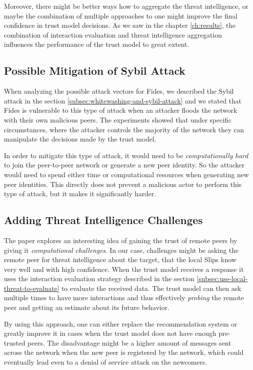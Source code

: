 Moreover, there might be better ways how to aggregate the threat intelligence, or maybe the combination of multiple approaches to one might improve the final confidence in trust model decisions.
As we saw in the chapter \ref{ch:results}, the combination of interaction evaluation and threat intelligence aggregation influences the performance of the trust model to great extent.

\subsection{Possible Mitigation of Sybil Attack}
\label{subsec:possible-mittigation-of-sybil-attack}
When analyzing the possible attack vectors for Fides, we described the Sybil attack in the section \ref{subsec:whitewashing-and-sybil-attack} and we stated that Fides is vulnerable to this type of attack when an attacker floods the network with their own malicious peers.
The experiments showed that under specific circumstances, where the attacker controls the majority of the network they can manipulate the decisions made by the trust model.

In order to mitigate this type of attack, it would need to be \textit{computationally hard} to join the peer-to-peer network or generate a new peer identity.
So the attacker would need to spend either time or computational resources when generating new peer identities.
This directly does not prevent a malicious actor to perform this type of attack, but it makes it significantly harder.

\subsection{Adding Threat Intelligence Challenges}
\label{subsec:adding-threat-intelligence-challenges}
The paper \cite{fung2008trust} explores an interesting idea of gaining the trust of remote peers by giving it \textit{computational challenges}.
In our case, challenges might be asking the remote peer for threat intelligence about the target, that the local Slips know very well and with high confidence.
When the trust model receives a response it uses the interaction evaluation strategy described in the section \ref{subsec:use-local-threat-to-evaluate} to evaluate the received data.
The trust model can then ask multiple times to have more interactions and thus effectively \textit{probing} the remote peer and getting an estimate about its future behavior.

By using this approach, one can either replace the recommendation system or greatly improve it in cases when the trust model does not have enough pre-trusted peers.
The disadvantage might be a higher amount of messages sent across the network when the new peer is registered by the network, which could eventually lead even to a denial of service attack on the newcomers. 

